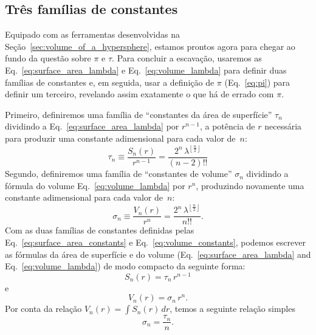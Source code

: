 


  \subsection{Três famílias de constantes} %
  \label{sec:three_families_of_constants}

Equipado com as ferramentas desenvolvidas na Seção~\ref{sec:volume_of_a_hypersphere}, estamos prontos agora para chegar ao fundo da questão sobre $\pi$ e $\tau$. Para concluir a escavação, usaremos as Eq.~\eqref{eq:surface_area_lambda} e Eq.~\eqref{eq:volume_lambda} para definir duas famílias de constantes e, em seguida, usar a definição de $\pi$ (Eq.~\eqref{eq:pi}) para definir um terceiro, revelando assim exatamente o que há de errado com $\pi$.

Primeiro, definiremos uma família de ``constantes da área de superfície'' $\tau_n$ dividindo \linebreak a Eq.~\eqref{eq:surface_area_lambda} por $r^{n-1}$, a potência de $r$ necessária para produzir uma constante adimensional para cada valor de~$n$:
\begin{equation}
\label{eq:surface_area_constants}
\tau_n \equiv \frac{S_n(r)}{r^{n-1}} = \frac{2^n\,\lambda^{\left\lfloor \frac{n}{2} \right\rfloor}}{(n-2)!!}
\end{equation}
Segundo, definiremos uma família de ``constantes de volume'' $\sigma_n$ dividindo a fórmula do volume Eq.~\eqref{eq:volume_lambda} por $r^n$, produzindo novamente uma constante adimensional para cada valor de~$n$:
\begin{equation}
\label{eq:volume_constants}
\sigma_n \equiv \frac{V_n(r)}{r^n} = \frac{2^n\,\lambda^{\left\lfloor \frac{n}{2} \right\rfloor}}{n!!}.
\end{equation}
Com as duas famílias de constantes definidas pelas Eq.~\eqref{eq:surface_area_constants} e Eq.~\eqref{eq:volume_constants}, podemos escrever as fórmulas da área de superfície e do volume (Eq.~\eqref{eq:surface_area_lambda} and Eq.~\eqref{eq:volume_lambda}) de modo compacto da seguinte forma:
\[ S_n(r) = \tau_n\,r^{n-1} \]
e
\[ V_n(r) = \sigma_n\,r^n. \]
Por conta da relação $V_n(r) = \int S_n(r)\,dr$, temos a seguinte relação simples
\[
\sigma_n = \frac{\tau_n}{n}.
\]


